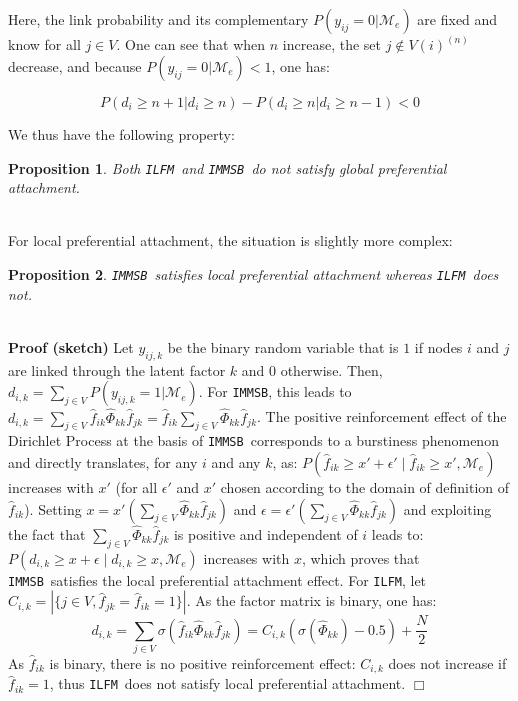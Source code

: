 \documentclass[conference]{IEEEtran}
\newcommand{\ifm}{\texttt{ILFM}}
\newcommand{\imb}{\texttt{IMMSB}}
\newcommand{\pr}{P}
\newtheorem{proposition}{Proposition}[section]
\begin{document}
Here, the link probability and its complementary $P(y_{ij}=0 | \mathcal{M}_e)$ are fixed and know for all $j\in V$. One can see that when $n$ increase, the set $j\notin V(i)^{(n)}$ decrease, and because  $P(y_{ij}=0 | \mathcal{M}_e) < 1$, one has: 

\begin{equation*}
    P(d_i \geq n+1 | d_i \geq n) -  P(d_i \geq n | d_i \geq n-1) < 0
\end{equation*}

We thus have the following property: ~\\




\begin{proposition}
\label{pref-attch-glob}
Both \ifm\ and \imb\ do not satisfy global preferential attachment.
\end{proposition}~\\

%
For local preferential attachment, the situation is slightly more complex:~\\
%
\begin{proposition}
\label{pref-attch-loc}
\imb\ satisfies local preferential attachment whereas \ifm\ does not.
\end{proposition}~\\
%
\noindent \textbf{Proof (sketch)} Let $y_{ij,k}$ be the binary random variable that is $1$ if nodes $i$ and $j$ are linked through the latent factor $k$ and $0$ otherwise. Then, $d_{i,k} = \sum_{j \in V} \pr(y_{ij,k} =1 | \mathcal{M}_e)$. For \imb, this leads to $d_{i,k} = \sum_{j \in V} \hat{f}_{ik} \hat{\Phi}_{kk} \hat{f}_{jk} = \hat{f}_{ik} \sum_{j \in V} \hat{\Phi}_{kk} \hat{f}_{jk}$. The positive reinforcement effect of the Dirichlet Process \cite{HDP} at the basis of \imb\ corresponds to a burstiness phenomenon and directly translates, for any $i$ and any $k$, as: $\pr(\hat{f}_{ik} \ge x'+\epsilon' \mid \hat{f}_{ik} \ge x',\mathcal{M}_e)$ increases with $x'$ (for all $\epsilon'$ and $x'$ chosen according to the domain of definition of $\hat{f}_{ik}$). Setting $x=x'(\sum_{j\in V} \hat{\Phi}_{kk} \hat{f}_{jk})$ and $\epsilon = \epsilon'(\sum_{j\in V} \hat{\Phi}_{kk} \hat{f}_{jk})$ and exploiting the fact that $\sum_{j\in V} \hat{\Phi}_{kk} \hat{f}_{jk}$ is positive and independent of $i$ leads to: $\pr(d_{i,k} \ge x+\epsilon \mid d_{i,k} \ge x, \mathcal{M}_e)$ increases with $x$, which proves that \imb\ satisfies the local preferential attachment effect. For \ifm,  let $C_{i,k} = |\{j \in V, \hat{f}_{jk} = \hat{f}_{ik} = 1\}|$. As the factor matrix is binary, one has:
%
\[ 
d_{i,k} = \sum_{j\in V} \sigma(\hat{f}_{ik} \hat{\Phi}_{kk} \hat{f}_{jk}) =  C_{i,k} (\sigma(\hat{\Phi}_{kk})-0.5) + \frac{N}{2}
\]
%
As $\hat{f}_{ik}$ is binary, there is no positive reinforcement effect: $C_{i,k}$ does not increase if $\hat{f}_{ik}=1$, thus \ifm\ does not satisfy local preferential attachment. \hspace{4.69cm} $\Box$~\\
\end{document}
